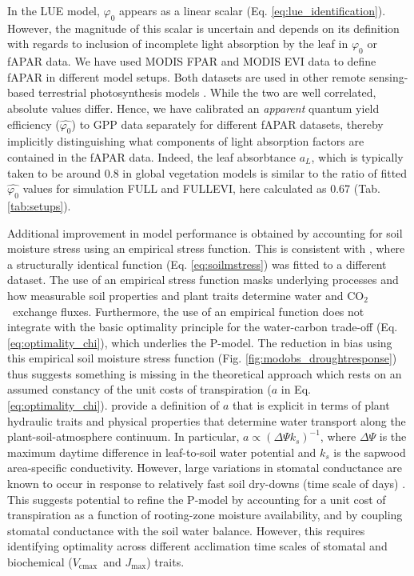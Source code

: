 \documentclass[gmd, manuscript]{copernicus}
\newcommand{\coo}{CO$_2$}
\newcommand{\vcmax}{$V_{\text{cmax}}$}
\newcommand{\jmax}{$J_{\text{max}}$}
\begin{document}
In the LUE model, $\varphi_0$ appears as a linear scalar (Eq. \ref{eq:lue_identification}). However, the magnitude of this scalar is uncertain and depends on its definition with regards to inclusion of incomplete light absorption by the leaf in $\varphi_0$ or fAPAR data. We have used MODIS FPAR and MODIS EVI data to define fAPAR in different model setups. Both datasets are used in other remote sensing-based terrestrial photosynthesis models \citep{Zhang2017-yr, jiang16rse}. While the two are well correlated, absolute values differ. Hence, we have calibrated an \textit{apparent} quantum yield efficiency ($\widehat{\varphi_0}$) to GPP data separately for different fAPAR datasets, thereby implicitly distinguishing what components of light absorption factors are contained in the fAPAR data. Indeed, the leaf absorbtance $a_L$, which is typically taken to be around 0.8 in global vegetation models \citep{rogers17} is similar to the ratio of fitted $\widehat{\varphi_0}$ values for simulation FULL and FULL\textunderscore EVI, here calculated as 0.67 (Tab. \ref{tab:setups}).

Additional improvement in model performance is obtained by accounting for soil moisture stress using an empirical stress function. This is consistent with  \citet{stocker19natgeo}, where a structurally identical function (Eq. \ref{eq:soilmstress}) was fitted to a different dataset. The use of an empirical stress function masks underlying processes and how measurable soil properties and plant traits determine water and \coo\ exchange fluxes. Furthermore, the use of an empirical function does not integrate with the basic optimality principle for the water-carbon trade-off (Eq. \ref{eq:optimality_chi}), which underlies the P-model. The reduction in bias using this empirical soil moisture stress function (Fig. \ref{fig:modobs_droughtresponse}) thus suggests something is missing in the theoretical approach which rests on an assumed constancy of the unit costs of transpiration ($a$ in Eq. \ref{eq:optimality_chi}). \citet{prentice14ecollett} provide a definition of $a$ that is explicit in terms of plant hydraulic traits and physical properties that determine water transport along the plant-soil-atmosphere continuum. In particular, $a \propto ( \Delta \Psi k_s )^{-1}$, where $\Delta \Psi$ is the maximum daytime difference in leaf-to-soil water potential and $k_s$ is the sapwood area-specific conductivity. However, large variations in stomatal conductance are known to occur in response to relatively fast soil dry-downs (time scale of days) \citep{keenan10agrformet, egea11, stocker18newphyt}. This suggests potential to refine the P-model by accounting for a unit cost of transpiration as a function of rooting-zone moisture availability, and by coupling stomatal conductance with the soil water balance. However, this requires identifying optimality across different acclimation time scales of stomatal and biochemical (\vcmax\ and \jmax ) traits.
\end{document}
